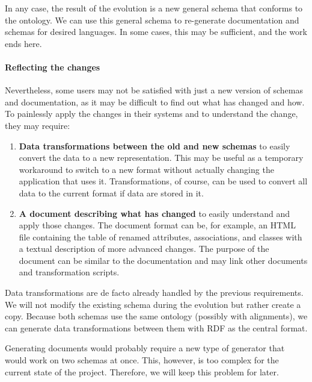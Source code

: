 In any case, the result of the evolution is a new general schema that conforms to the ontology. We can use this general schema to re-generate documentation and schemas for desired languages. In some cases, this may be sufficient, and the work ends here.

\paragraph{Reflecting the changes} Nevertheless, some users may not be satisfied with just a new version of schemas and documentation, as it may be difficult to find out what has changed and how. To painlessly apply the changes in their systems and  to understand the change, they may require:

\begin{enumerate}
    \item \textbf{Data transformations between the old and new schemas} to easily convert the data to a new representation. This may be useful as a temporary workaround to switch to a new format without actually changing the application that uses it. Transformations, of course, can be used to convert all data to the current format if data are stored in it.
    \item \textbf{A document describing what has changed} to easily understand and apply those changes. The document format can be, for example, an HTML file containing the table of renamed attributes, associations, and classes with a textual description of more advanced changes. The purpose of the document can be similar to the documentation and may link other documents and transformation scripts.
\end{enumerate}

Data transformations are de facto already handled by the previous requirements. We will not modify the existing schema during the evolution but rather create a copy. Because both schemas use the same ontology (possibly with alignments), we can generate data transformations between them with RDF as the central format.

Generating documents would probably require a new type of generator that would work on two schemas at once. This, however, is too complex for the current state of the project. Therefore, we will keep this problem for later.
